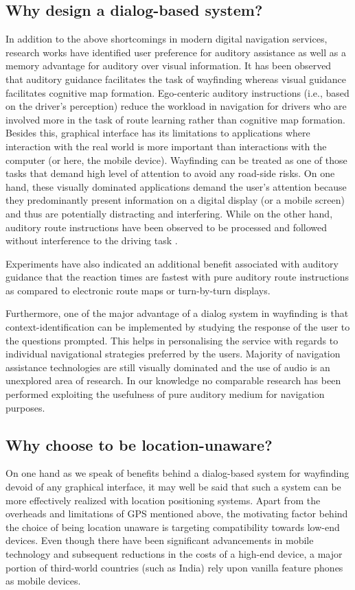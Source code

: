 \documentclass{iitkthesis}
\begin{document}
\subsection{Why design a dialog-based system?}
In addition to the above shortcomings in modern digital navigation services, research works \cite{jensen2010,dalton,reagan2006} have identified user preference for auditory assistance as well as a memory advantage for auditory over visual information. It has been observed \cite{baldwin2009,furukawa2004} that auditory guidance facilitates the task of wayfinding whereas visual guidance facilitates cognitive map formation. Ego-centeric auditory instructions (i.e., based on the driver's perception) reduce the workload in navigation for drivers who are involved more in the task of route learning rather than cognitive map formation. Besides this, graphical interface has its limitations to applications where interaction with the real world is more important than interactions with the computer (or here, the mobile device). Wayfinding can be treated as one of those tasks that demand high level of attention to avoid any road-side risks. On one hand, these visually dominated applications demand the user’s
attention because they predominantly present information on a digital display (or a mobile screen) and thus are potentially distracting and interfering. While on the other hand, auditory route instructions have been observed to be processed and followed without interference to the driving task \cite{jensen2010,dalton}.

Experiments \cite{srinivasaneffect} have also indicated an additional benefit associated with auditory guidance that the reaction times are fastest with pure auditory route instructions as compared to electronic route maps or turn-by-turn displays. 

Furthermore,  one of the major advantage of a dialog system in wayfinding is that context-identification can be implemented by studying the response of the user to the questions prompted. This helps in personalising the service with regards to individual navigational strategies preferred by the users. Majority of navigation assistance technologies are still visually dominated and the use of audio is an unexplored area of research. In our knowledge no comparable research has been performed exploiting the usefulness of pure auditory medium for navigation purposes.
\subsection{Why choose to be location-unaware?}
On one hand as we speak of benefits behind a dialog-based system for wayfinding devoid of any graphical interface, it may well be said that such a system can be more effectively realized with location positioning systems. Apart from the overheads and limitations of GPS mentioned above, the motivating factor behind the choice of being location unaware is targeting compatibility towards low-end devices. Even though there have been significant advancements in mobile technology and subsequent reductions in the costs of a high-end device, a major portion of third-world countries (such as India) rely upon vanilla feature phones as mobile devices. 
\end{document}
